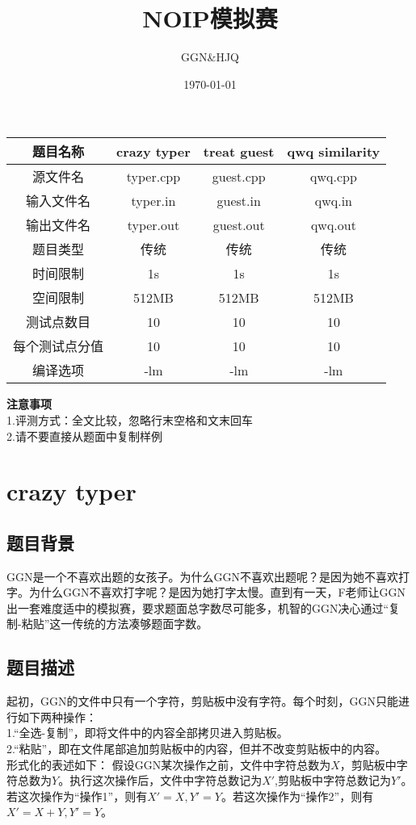 \documentclass[12pt]{ctexart}
\title{\textbf{NOIP模拟赛}}
\author{GGN\&HJQ}
\date{\today}
\begin{document}
\maketitle
\begin{center}
	\begin{tabular}{|c|c|c|c|}
		\hline 题目名称&crazy typer&treat guest&qwq similarity\\
		\hline 源文件名&typer.cpp&guest.cpp&qwq.cpp\\
		\hline 输入文件名&typer.in&guest.in&qwq.in\\
		\hline 输出文件名&typer.out&guest.out&qwq.out\\
		\hline 题目类型&传统&传统&传统\\
		\hline 时间限制&1s&1s&1s\\
		\hline 空间限制&512MB&512MB&512MB\\
		\hline 测试点数目&10&10&10\\
		\hline 每个测试点分值&10&10&10\\
		\hline 编译选项&-lm&-lm&-lm\\
		\hline
	\end{tabular}
\end{center}
\textbf{注意事项}\\
1.评测方式：全文比较，忽略行末空格和文末回车\\
2.请不要直接从题面中复制样例
\newpage
\section{crazy typer}
\subsection{题目背景}
GGN是一个不喜欢出题的女孩子。为什么GGN不喜欢出题呢？是因为她不喜欢打字。为什么GGN不喜欢打字呢？是因为她打字太慢。直到有一天，F老师让GGN出一套难度适中的模拟赛，要求题面总字数尽可能多，机智的GGN决心通过“复制-粘贴”这一传统的方法凑够题面字数。
\subsection{题目描述}
起初，GGN的文件中只有一个字符，剪贴板中没有字符。每个时刻，GGN只能进行如下两种操作：\\
1.“全选-复制”，即将文件中的内容全部拷贝进入剪贴板。\\
2.“粘贴”，即在文件尾部追加剪贴板中的内容，但并不改变剪贴板中的内容。\\

形式化的表述如下：
假设GGN某次操作之前，文件中字符总数为$X$，剪贴板中字符总数为$Y$。执行这次操作后，文件中字符总数记为$X'$,剪贴板中字符总数记为$Y'$。\\
若这次操作为“操作1”，则有$X'=X,Y'=Y$。若这次操作为“操作2”，则有$X'=X+Y,Y'=Y$。\\
\end{document}

